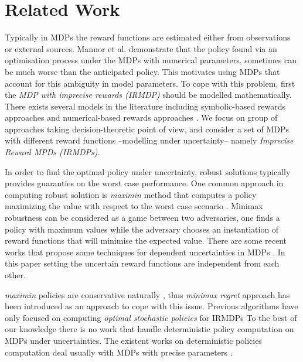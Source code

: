 \section{Related Work}

Typically in MDPs the reward functions are estimated either from observations or external sources. Mannor et al.  demonstrate that the policy found via an optimisation process under the MDPs with numerical parameters, sometimes can be much worse than the anticipated policy. This motivates using MDPs that account for this ambiguity in model parameters. To cope with this problem, first the \textit{MDP with imprecise rewards (IRMDP)} should be modelled mathematically. There exists several models in the literature including symbolic-based rewards approaches \cite{Furnkranz2012,Weng2012} and numerical-based rewards approaches \cite{bell1982,Regan2009,Xu2009}. We focus on group of approaches taking decision-theoretic point of view, and consider a set of MDPs with different reward functions --modelling under uncertainty-- namely \textit{Imprecise Reward MPDs (IRMDPs)}. 


In order to find the optimal policy under uncertainty, robust solutions typically provides guaranties on the worst case performance. One common approach in computing robust solution is \textit{maximin} method that computes a policy maximizing the value with respect to the worst case scenario \cite{GIVAN2000,Iyengar2005,mastin2012,Nilim2005}. Minimax robustness can be considered as a game between two adversaries, one finds a policy with maximum values while the adversary chooses an instantiation of reward functions that will minimise the expected value. There are some recent works that propose some techniques for dependent uncertainties in MDPs \cite{Mannor2012,Wiesemann2013}. In this paper setting the uncertain reward functions are independent from each other. 

\textit{maximin} policies are conservative naturally \cite{Delage2007}, thus \textit{minimax regret} approach \cite{Regan2009,Xu2009} has been introduced as an approach to cope with this issue. %
Previous algorithms \cite{Ahmed2017,Regan2009,Regan2010,Xu2009} have only focused on computing  \textit{optimal stochastic policies} for IRMDPs%
To the best of our knowledge there is no work that handle deterministic policy computation on MDPs under uncertainties. The existent works on deterministic policies computation deal usually with MDPs with precise parameters \cite{Dolgov2005,Montufar2015}. %